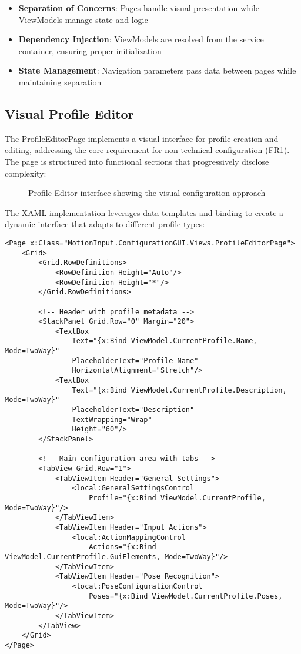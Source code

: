 \begin{itemize}
    \item \textbf{Separation of Concerns}: Pages handle visual presentation while ViewModels manage state and logic
    \item \textbf{Dependency Injection}: ViewModels are resolved from the service container, ensuring proper initialization
    \item \textbf{State Management}: Navigation parameters pass data between pages while maintaining separation
\end{itemize}

\subsection{Visual Profile Editor}
The ProfileEditorPage implements a visual interface for profile creation and editing, addressing the core requirement for non-technical configuration (FR1). The page is structured into functional sections that progressively disclose complexity:

\begin{figure}[h]
\centering
\caption{Profile Editor interface showing the visual configuration approach}
\label{fig:profile_editor}
\end{figure}

The XAML implementation leverages data templates and binding to create a dynamic interface that adapts to different profile types:

\begin{verbatim}
<Page x:Class="MotionInput.ConfigurationGUI.Views.ProfileEditorPage">
    <Grid>
        <Grid.RowDefinitions>
            <RowDefinition Height="Auto"/>
            <RowDefinition Height="*"/>
        </Grid.RowDefinitions>
        
        <!-- Header with profile metadata -->
        <StackPanel Grid.Row="0" Margin="20">
            <TextBox 
                Text="{x:Bind ViewModel.CurrentProfile.Name, Mode=TwoWay}"
                PlaceholderText="Profile Name" 
                HorizontalAlignment="Stretch"/>
            <TextBox 
                Text="{x:Bind ViewModel.CurrentProfile.Description, Mode=TwoWay}"
                PlaceholderText="Description"
                TextWrapping="Wrap"
                Height="60"/>
        </StackPanel>
        
        <!-- Main configuration area with tabs -->
        <TabView Grid.Row="1">
            <TabViewItem Header="General Settings">
                <local:GeneralSettingsControl 
                    Profile="{x:Bind ViewModel.CurrentProfile, Mode=TwoWay}"/>
            </TabViewItem>
            <TabViewItem Header="Input Actions">
                <local:ActionMappingControl 
                    Actions="{x:Bind ViewModel.CurrentProfile.GuiElements, Mode=TwoWay}"/>
            </TabViewItem>
            <TabViewItem Header="Pose Recognition">
                <local:PoseConfigurationControl 
                    Poses="{x:Bind ViewModel.CurrentProfile.Poses, Mode=TwoWay}"/>
            </TabViewItem>
        </TabView>
    </Grid>
</Page>
\end{verbatim}

